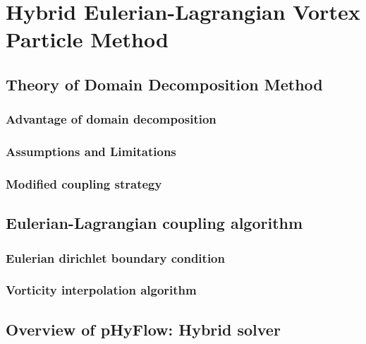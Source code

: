 \chapter{Hybrid Eulerian-Lagrangian Vortex Particle Method}

\section{Theory of Domain Decomposition Method}

\subsection{Advantage of domain decomposition}

\subsection{Assumptions and Limitations}

\subsection{Modified coupling strategy}

\section{Eulerian-Lagrangian coupling algorithm}

\subsection{Eulerian dirichlet boundary condition}

\subsection{Vorticity interpolation algorithm}

\section{Overview of pHyFlow: Hybrid solver}

